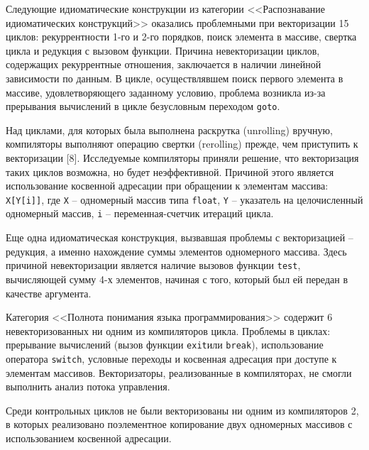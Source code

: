 Следующие идиоматические конструкции из категории <<Распознавание идиоматических конструкций>> оказались проблемными при векторизации 15 циклов: рекуррентности 1-го и 2-го порядков, поиск элемента в массиве, свертка цикла и редукция с вызовом функции. Причина невекторизации циклов, содержащих рекуррентные отношения, заключается в наличии линейной зависимости по данным. В цикле, осуществлявшем поиск первого элемента в массиве, удовлетворяющего заданному условию, проблема возникла из-за прерывания вычислений в цикле безусловным переходом \texttt{goto}.

Над циклами, для которых была выполнена раскрутка (unrolling) вручную, компиляторы выполняют операцию свертки (rerolling) прежде, чем приступить к векторизации [8]. Исследуемые компиляторы приняли решение, что векторизация таких циклов возможна, но будет неэффективной. Причиной этого является использование косвенной адресации при обращении к элементам массива: \texttt{X[Y[i]]}, где \texttt{X} -- одномерный массив типа \texttt{float}, \texttt{Y} -- указатель на целочисленный одномерный массив, \texttt{i} -- переменная-счетчик итераций цикла.

Еще одна идиоматическая конструкция, вызвавшая проблемы с векторизацией -- редукция, а именно нахождение суммы элементов одномерного массива. Здесь причиной невекторизации является наличие вызовов функции \texttt{test}, вычисляющей сумму 4-х элементов, начиная с того, который был ей передан в качестве аргумента. 

Категория <<Полнота понимания языка программирования>> содержит 6 невекторизованных ни одним из компиляторов цикла. Проблемы в циклах: прерывание вычислений (вызов функции \texttt{exit}или \texttt{break}), использование оператора \texttt{switch}, условные переходы и косвенная адресация при доступе к элементам массивов. Векторизаторы, реализованные в компиляторах, не смогли выполнить анализ потока управления.

Среди контрольных циклов не были векторизованы ни одним из компиляторов 2, в которых реализовано поэлементное копирование двух одномерных массивов с использованием косвенной адресации.


